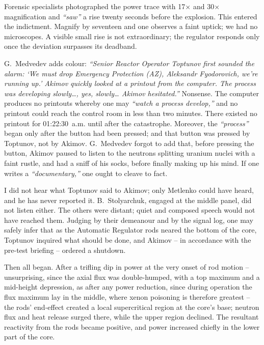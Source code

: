 \documentclass[openright]{bookest}
\begin{document}
Forensic specialists photographed the power trace with \num{17}$\times$ and \num{30}$\times$ magnification and \textit{``saw''} a rise twenty seconds before the explosion. This entered the indictment. Magnify by seventeen and one observes a faint uptick; we had no microscopes. A visible small rise is not extraordinary; the regulator responds only once the deviation surpasses its deadband.

G.~Medvedev adds colour: \textit{``Senior Reactor Operator Toptunov first sounded the alarm: `We must drop Emergency Protection (AZ), Aleksandr Fyodorovich, we're running up.' Akimov quickly looked at a printout from the computer. The process was developing slowly\ldots, yes, slowly\ldots{} Akimov hesitated.''} Nonsense. The computer produces no printouts whereby one may \textit{``watch a process develop,''} and no printout could reach the control room in less than two minutes. There existed no printout for 01:22:30~a.m. until after the catastrophe. Moreover, the \textit{``process''} began only after the button had been pressed; and that button was pressed by Toptunov, not by Akimov. G.~Medvedev forgot to add that, before pressing the button, Akimov paused to listen to the neutrons splitting uranium nuclei with a faint rustle, and had a sniff of his socks, before finally making up his mind. If one writes a \textit{``documentary,''} one ought to cleave to fact.

I did not hear what Toptunov said to Akimov; only Metlenko could have heard, and he has never reported it. B.~Stolyarchuk, engaged at the middle panel, did not listen either. The others were distant; quiet and composed speech would not have reached them. Judging by their demeanour and by the signal log, one may safely infer that as the Automatic Regulator rods neared the bottom of the core, Toptunov inquired what should be done, and Akimov -- in accordance with the pre-test briefing -- ordered a shutdown.

Then all began. After a trifling dip in power at the very onset of rod motion -- unsurprising, since the axial flux was double-humped, with a top maximum and a mid-height depression, as after any power reduction, since during operation the flux maximum lay in the middle, where xenon poisoning is therefore greatest -- the rods' end-effect created a local supercritical region at the core's base; neutron flux and heat release surged there, while the upper region declined. The resultant reactivity from the rods became positive, and power increased chiefly in the lower part of the core.
\end{document}
